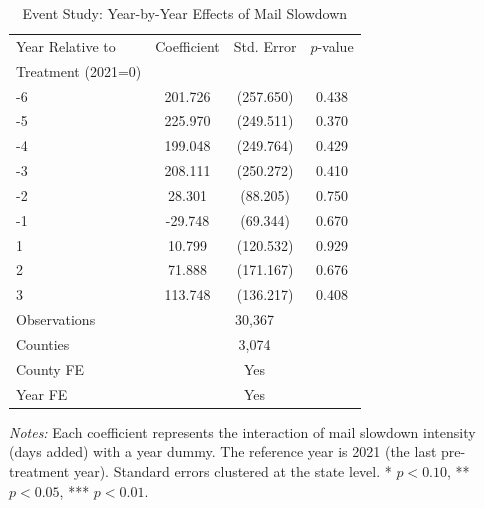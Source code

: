 \begin{table}[htbp]
\centering
\caption{Event Study: Year-by-Year Effects of Mail Slowdown}
\label{tab:event_study}
\begin{tabular}{lccc}
\toprule
Year Relative to & Coefficient & Std. Error & $p$-value \\
Treatment (2021=0) & & & \\
\midrule
-6 & 201.726 & (257.650) & 0.438 \\
-5 & 225.970 & (249.511) & 0.370 \\
-4 & 199.048 & (249.764) & 0.429 \\
-3 & 208.111 & (250.272) & 0.410 \\
-2 & 28.301 & (88.205) & 0.750 \\
-1 & -29.748 & (69.344) & 0.670 \\
1 & 10.799 & (120.532) & 0.929 \\
2 & 71.888 & (171.167) & 0.676 \\
3 & 113.748 & (136.217) & 0.408 \\
\midrule
Observations & \multicolumn{3}{c}{30,367} \\
Counties & \multicolumn{3}{c}{3,074} \\
County FE & \multicolumn{3}{c}{Yes} \\
Year FE & \multicolumn{3}{c}{Yes} \\
\bottomrule
\end{tabular}
\begin{tablenotes}[flushleft]
\small
\item \textit{Notes:} Each coefficient represents the interaction of mail slowdown intensity (days added) with a year dummy. The reference year is 2021 (the last pre-treatment year). Standard errors clustered at the state level. * $p<0.10$, ** $p<0.05$, *** $p<0.01$.
\end{tablenotes}
\end{table}
